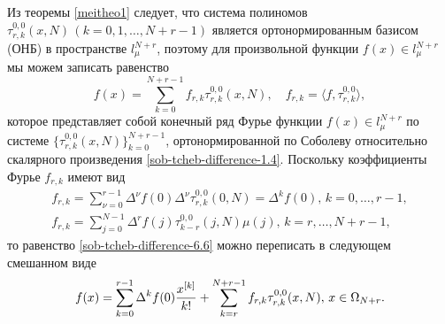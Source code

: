 Из теоремы \ref{meitheo1} следует, что система полиномов $\tau_{r,k}^{0,0}(x,N)\, (k=0,1,\ldots,N+r-1)$
является ортонормированным базисом (ОНБ) в пространстве $l_\mu^{N+r}$, поэтому для произвольной функции $f(x)\in l_\mu^{N+r}$ мы можем записать равенство
\begin{equation}\label{sob-tcheb-difference-6.6}
f(x)= \sum_{k=0}^{N+r-1} f_{r,k} \tau_{r,k}^{0,0}(x,N), \quad
f_{r,k}=\langle f,\tau_{r,k}^{0,0} \rangle,
\end{equation}
которое представляет собой конечный ряд Фурье функции $f(x)\in l_\mu^{N+r}$ по системе
$\{\tau_{r,k}^{0,0}(x,N)\}_{k=0}^{N+r-1}$, ортонормированной по Соболеву относительно скалярного произведения \eqref{sob-tcheb-difference-1.4}. Поскольку коэффициенты Фурье $f_{r,k}$ имеют  вид
\begin{gather}\label{sob-tcheb-difference-6.7}
f_{r,k}=
\sum_{\nu=0}^{r-1}\Delta^\nu f(0)\Delta^\nu \tau_{r,k}^{0,0}(0,N)=\Delta^kf(0),\, k=0,\ldots, r-1,\\
\label{sob-tcheb-difference-6.8}
f_{r,k}=
\sum_{j=0}^{N-1}\Delta^rf(j)\tau_{k-r}^{0,0}(j,N)\mu(j),\, k=r,\ldots, N+r-1,
\end{gather}
то равенство \eqref{sob-tcheb-difference-6.6} можно переписать в следующем  смешанном виде
\begin{equation}\label{sob-tcheb-difference-6.9}
 f(x)= \sum_{k=0}^{r-1}\Delta^kf(0){x^{[k]}\over k!} +\sum_{k=r}^{N+r-1}f_{r,k} \tau_{r,k}^{0,0}(x,N),\, x\in \Omega_{N+r}.
\end{equation}






